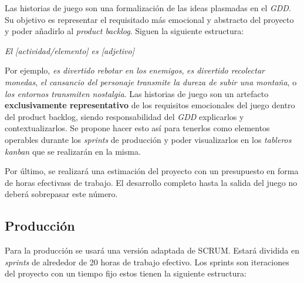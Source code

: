 Las historias de juego son una formalización de las ideas plasmadas en el \textit{GDD}. Su objetivo es representar el requisitado más emocional y abstracto del proyecto y poder añadirlo al \textit{product backlog}. Siguen la siguiente estructura:\\

\centerline{\textit{El [actividad/elemento] es [adjetivo]}}

Por ejemplo, \textit{es divertido rebotar en los enemigos}, \textit{es divertido recolectar monedas}, \textit{el cansancio del personaje transmite la dureza de subir una montaña}, o \textit{los entornos transmiten nostalgia}. Las historias de juego son un artefacto \textbf{exclusivamente representativo} de los requisitos emocionales del juego dentro del product backlog, siendo responsabilidad del \textit{GDD} explicarlos y contextualizarlos. Se propone hacer esto así para tenerlos como elementos operables durante los \textit{sprints} de producción y poder visualizarlos en los \textit{tableros kanban} que se realizarán en la misma.

Por último, se realizará una estimación del proyecto con un presupuesto en forma de horas efectivass de trabajo. El desarrollo completo hasta la salida del juego no deberá sobrepasar este número.

\subsection{Producción}


Para la producción se usará una versión adaptada de SCRUM. Estará dividida en \textit{sprints} de alrededor de 20 horas de trabajo efectivo. Los sprints son iteraciones del proyecto con un tiempo fijo estos tienen la siguiente estructura:

